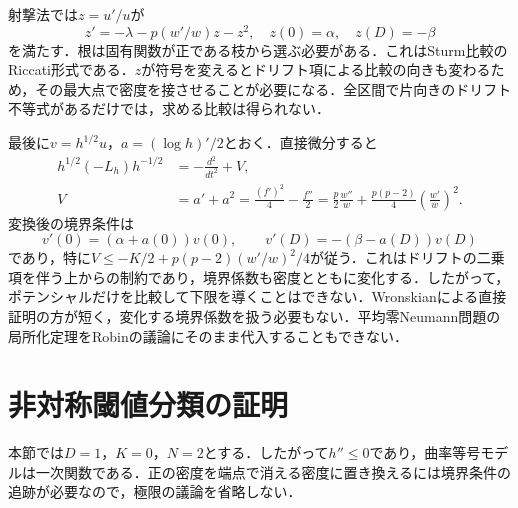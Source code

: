 \documentclass[12pt]{amsart}
\theoremstyle{definition}
\theoremstyle{remark}
\numberwithin{equation}{section}
\begin{document}
射撃法では$z=u'/u$が
\[
 z'=-\lambda-p(w'/w)z-z^2,\quad z(0)=\alpha,\quad z(D)=-\beta
\]
を満たす．根は固有関数が正である枝から選ぶ必要がある．これはSturm比較のRiccati形式である．$z$が符号を変えるとドリフト項による比較の向きも変わるため，その最大点で密度を接させることが必要になる．全区間で片向きのドリフト不等式があるだけでは，求める比較は得られない．

最後に$v=h^{1/2}u$，$a=(\log h)'/2$とおく．直接微分すると
\begin{align*}
 h^{1/2}(-L_h)h^{-1/2}&=-\frac{d^2}{dt^2}+V,\\
 V&=a'+a^2=\frac{(f')^2}{4}-\frac{f''}{2}
 =\frac p2\frac{w''}{w}+\frac{p(p-2)}4\left(\frac{w'}w\right)^2.
\end{align*}
変換後の境界条件は
\[
 v'(0)=(\alpha+a(0))v(0),\qquad
 v'(D)=-(\beta-a(D))v(D)
\]
であり，特に$V\le-K/2+p(p-2)(w'/w)^2/4$が従う．これはドリフトの二乗項を伴う上からの制約であり，境界係数も密度とともに変化する．したがって，ポテンシャルだけを比較して下限を導くことはできない．Wronskianによる直接証明の方が短く，変化する境界係数を扱う必要もない．平均零Neumann問題の局所化定理をRobinの議論にそのまま代入することもできない．

\section{非対称閾値分類の証明}
本節では$D=1$，$K=0$，$N=2$とする．したがって$h''\le0$であり，曲率等号モデルは一次関数である．正の密度を端点で消える密度に置き換えるには境界条件の追跡が必要なので，極限の議論を省略しない．
\end{document}
